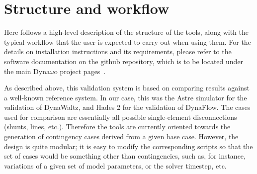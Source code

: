 \documentclass[conference]{IEEEtran}
\begin{document}
\section{Structure and workflow}

Here follows a high-level description of the structure of the tools,
along with the typical workflow that the user is expected to carry out
when using them.  For the details on installation instructions and its
requirements, please refer to the software documentation on the github
repository, which is to be located under the main Dyna$\omega$o
project pages~\cite{DwoGitRepos}.

As described above, this validation system is based on comparing
results against a well-known reference system. In our case, this was
the Astre simulator for the validation of DynaWaltz, and Hades 2 for
the validation of DynaFlow. The cases used for comparison are
essentially all possible single-element disconnections (shunts, lines,
etc.). Therefore the tools are currently oriented towards the
generation of contingency cases derived from a given base
case. However, the design is quite modular; it is easy to modify the
corresponding scripts so that the set of cases would be something
other than contingencies, such as, for instance, variations of a given
set of model parameters, or the solver timestep, etc.
\end{document}
